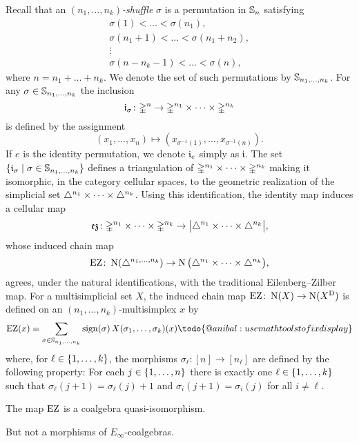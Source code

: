 Recall that an \textit{$(n_1,\dots,n_k)$-shuffle} $\sigma$ is a permutation in $\sym_n$ satisfying
\begin{gather*}
	\sigma(1) < \dots < \sigma(n_1), \\
	\sigma(n_1+1) < \dots < \sigma(n_1+n_2), \\
	\vdots \\
	\sigma(n-n_k-1) < \dots < \sigma(n),
\end{gather*}
where $n = n_1+\dots+n_k$.
We denote the set of such permutations by $\sh_{n_1,\dots,n_k}$.
For any $\sigma \in \sh_{n_1,\dots,n_k}$ the inclusion
\[
\gi_\sigma \colon \gsimplex^n \to \gmsimplex{n_1}{n_k}
\]
is defined by the assignment
\[
(x_1,\dots,x_n) \mapsto (x_{\sigma^{-1}(1)}, \dots, x_{\sigma^{-1}(n)}).
\]
If $e$ is the identity permutation, we denote $\gi_{e}$ simply as $\mathfrak{i}$.
The set $\set{\gi_\sigma \mid \sigma \in \sh_{n_1,\dots,n_k}}$ defines a triangulation of $\gmsimplex{n_1}{n_k}$ making it isomorphic, in the category cellular spaces, to the geometric realization of the simplicial set $\msimplex{n_1}{n_k}$.
Using this identification, the identity map induces a cellular map
\[
\ez \colon \gmsimplex{n_1}{n_k} \to \bars[\big]{\msimplex{n_1}{n_k}},
\]
whose induced chain map
\[
\EZ \colon \chains(\simplex^{n_1,\dots,n_k}) \to \chains\big(\msimplex{n_1}{n_k}\big),
\]
agrees, under the natural identifications, with the traditional Eilenberg--Zilber map.
For a multisimplicial set $X$, the induced chain map $\EZ \colon \chains(X) \to \chains(X^\diag)$ is defined on an $(n_1,\dots,n_k)$-multisimplex $x$ by
\[
\EZ(x) = \sum_{\sigma \in \sh_{n_1,\dots,n_k}} \sign(\sigma) \, X(\sigma_1 ,\dots, \sigma_k)(x) \todo{@anibal: use mathtools to fix display}
\]
where, for $\ell \in \set{1,\dots,k}$, the morphisms $\sigma_\ell \colon [n] \to [n_\ell]$ are defined by the following property: For
each $j \in \set{1,\dots,n}$ there is exactly one $\ell \in \set{1,\dots,k}$ such that $\sigma_\ell(j+1) = \sigma_\ell(j)+1$ and $\sigma_i(j+1) = \sigma_i(j)$ for all $i \neq \ell$.

\begin{lemma}
	The map $\EZ$ is a coalgebra quasi-isomorphism. 
\end{lemma}

\begin{remark}
	But not a morphisms of $E_\infty$-coalgebras. 
\end{remark}

